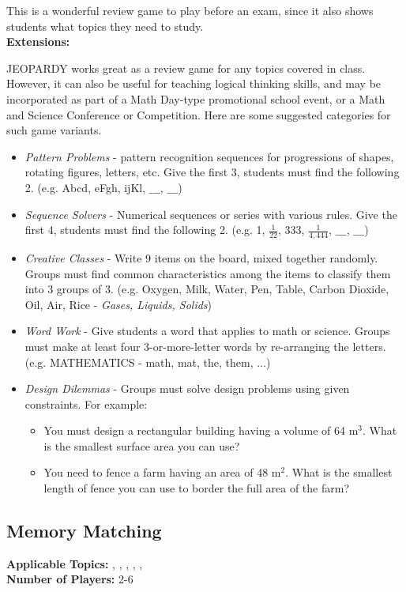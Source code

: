 	This is a wonderful review game to play before an exam, since it also shows students what topics they need to study.\\
	
	\noindent \textbf{Extensions:}
	
	\noindent JEOPARDY works great as a review game for any topics covered in class. However, it can also be useful for teaching logical thinking skills, and may be incorporated as part of a Math Day-type promotional school event, or a Math and Science Conference or Competition. Here are some suggested categories for such game variants.
	\begin{itemize}
	\item \emph{Pattern Problems} - pattern recognition sequences for progressions of shapes, rotating figures, letters, etc. Give the first 3, students must find the following 2. (e.g. Abcd, eFgh, ijKl, $\_\_\_$, $\_\_\_$)
	\item \emph{Sequence Solvers} - Numerical sequences or series with various rules. Give the first 4, students must find the following 2. (e.g. 1, $\frac{1}{22}$, 333, $\frac{1}{4,444}$, $\_\_\_$, $\_\_\_$)
	\item \emph{Creative Classes} - Write 9 items on the board, mixed together randomly. Groups must find common characteristics among the items to classify them into 3 groups of 3. (e.g. Oxygen, Milk, Water, Pen, Table, Carbon Dioxide, Oil, Air, Rice - \textit{Gases, Liquids, Solids})
	\item \emph{Word Work} - Give students a word that applies to math or science. Groups must make at least four 3-or-more-letter words by re-arranging the letters. (e.g. MATHEMATICS - math, mat, the, them, $\ldots$)
	\item \emph{Design Dilemmas} - Groups must solve design problems using given constraints. For example:
		\begin{itemize}
		\item You must design a rectangular building having a volume of 64 m$^3$. What is the smallest surface area you can use?
		\item You need to fence a farm having an area of 48 m$^2$. What is the smallest length of fence you can use to border the full area of the farm?
		\end{itemize}	 
	\end{itemize}
	
	\subsection{Memory Matching} \label{memory}
	\textbf{Applicable Topics:} , , , , , \\	
	\textbf{Number of Players:} 2-6\\
	
